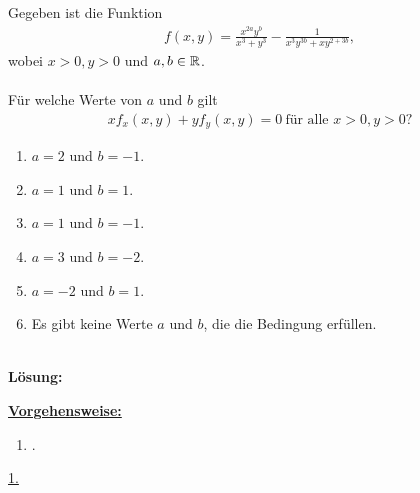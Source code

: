 \subsection*{}
Gegeben ist die Funktion
\begin{align*}
	f(x,y)
	=
	\frac{x^{2a} y^b}{x^3 +y^3}
	- 
	\frac{1}{x^3 y^{3b} + x y^{2 + 3b}},
\end{align*}
wobei $ x > 0, y > 0 $ und $ a,b \in \mathbb{R} $.\\
\\
Für welche Werte von $ a $ und $ b $ gilt
\begin{align*}
	x f_x(x,y) + y f_y(x,y) = 0 \ \textrm{für alle } x>0, y>0\textrm{?}
\end{align*}
\renewcommand{\labelenumi}{(\alph{enumi})}
\begin{enumerate}
	\item 
	$a = 2$ und $ b=-1 $.
	\item
	$a = 1$ und $ b=1 $.
	\item
	$a = 1$ und $ b=-1 $.
	\item
	$a = 3$ und $ b=-2 $.
	\item
	$a = -2$ und $ b=1 $.
	\item
	Es gibt keine Werte $ a $ und $ b $, die die Bedingung erfüllen.
\end{enumerate}
\ \\
\textbf{Lösung:}
\begin{mdframed}
\underline{\textbf{Vorgehensweise:}}
\renewcommand{\labelenumi}{\theenumi.}
\begin{enumerate}
\item .
\end{enumerate}
\end{mdframed}

\underline{1. }\\



